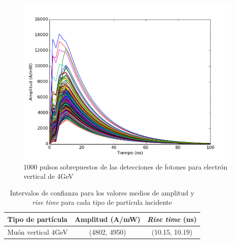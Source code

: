 \documentclass{book}
\begin{document}
\begin{figure}[h] %
\begin{center}
 \includegraphics[width=0.8\linewidth]{1000PulsosMu.png}
\caption{1000 pulsos sobrepuestos de las detecciones de fotones para electr\'on vertical de 4GeV}
\end{center}
\end{figure}

\begin{table}[h]
\caption{ Intervalos de confianza para los valores medios de amplitud y \textit{rise time} para cada tipo de part\'icula incidente}
\centering
\begin{tabular}{l | c c}
\hline
Tipo de part\'icula & Amplitud (A/mW) & \textit{Rise time} (ns) \\ \hline
Mu\'on vertical 4GeV & (4802, 4950) & (10.15, 10.19) \\

\hline
\end{tabular}
\end{table}



\end{document}
